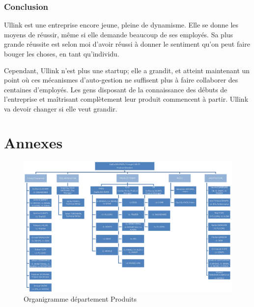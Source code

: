 \documentclass[a4paper, 12pt]{article}
\begin{document}

\pagebreak
\section*{Conclusion}

Ullink est une entreprise encore jeune, pleine de dynamisme. Elle se donne les moyens de réussir, même si elle demande beaucoup de ses employés. Sa plus grande réussite est selon moi d'avoir réussi à donner le sentiment qu'on peut faire bouger les choses, en tant qu'individu.

Cependant, Ullink n'est plus une startup; elle a grandit, et atteint maintenant un point où ces mécanismes d'auto-gestion ne suffisent plus à faire collaborer des centaines d'employés. Les gens disposant de la connaissance des débuts de l'entreprise et maîtrisant complètement leur produit commencent à partir. Ullink va devoir changer si elle veut grandir.

\pagebreak

\part*{Annexes}

\begin{figure}
\includegraphics[width=525pt, angle=90]{dep_product_orga.png}
\caption{Organigramme département Produits}
\label{Product_dpts_orga}
\end{figure}

\pagebreak


\end{document}
